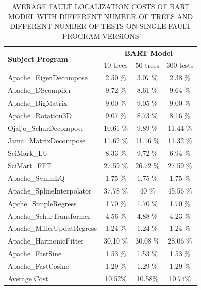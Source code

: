 \begin{table}[htbp!]
\caption{AVERAGE FAULT LOCALIZATION COSTS OF BART MODEL WITH DIFFERENT NUMBER OF TREES AND DIFFERENT NUMBER OF TESTS ON SINGLE-FAULT PROGRAM VERSIONS }
\label{sensitivity}
\centering
      \begin{tabular}{|l|c|c|c|}
      \hline
\multirow{2}{*}{{\bf Subject Program}}	&	\multicolumn{3}{|c|}{{\bf BART Model}}	\\	\cline{2-4}
& 10 trees & 50 trees & 300 tests\\ \hline
Apache\_EigenDecompose			&	2.50	\%	&	3.07	\%	&	2.38	\%	\\ \hline
Apache\_DScompiler			&	9.72	\%	&	8.61	\%	&	9.64	\%	\\ \hline
Apache\_BigMatrix			&	9.00	\%	&	9.05	\%	&	9.00	\%	\\ \hline
Apache\_Rotation3D			&	9.07	\%	&	8.73	\%	&	8.16	\%	\\ \hline
Ojaljo\_SchurDecompose			&	10.61	\%	&	9.89	\%	&	11.44	\%	\\ \hline
Jama\_MatrixDecompose			&	11.62	\%	&	11.16	\%	&	11.32	\%	\\ \hline
SciMark\_LU			&	8.33 \%	&	9.72	\%	&	6.94	\%	\\ \hline
SciMart\_FFT			&	27.59	\%	&	26.72	\%	&	27.59	\%	\\ \hline
Apache\_SymmLQ			&	1.75	\%	&	1.75	\%	&	1.75	\%	\\ \hline
Apache\_SplineInterpolator			&	37.78	\%	&	40	\%	&	45.56	\%	\\ \hline
Apche\_SimpleRegress			&	1.70	\%	&	1.70	\%	&	1.70	\%	\\ \hline
Apache\_SchurTransformer			&	4.56	\%	&	4.88	\%	&	4.23	\%	\\ \hline
Apache\_MillerUpdatRegress			&	1.24	\%	&	1.24	\%	&	1.24	\%	\\ \hline
Apache\_HarmonicFitter			&	30.10	\%	&	30.08	\%	&	28.06	\%	\\ \hline
Apache\_FastSine			&	1.53	\%	&	1.53	\%	&	1.53	\%	\\ \hline
Apache\_FastCosine			&	1.29	\%	&	1.29	\%	&	1.29	\%	\\ \hline
Average Cost 	&	10.52\% 	&10.58\% 	&10.74\%	\\ \hline
\end{tabular}
\end{table}

